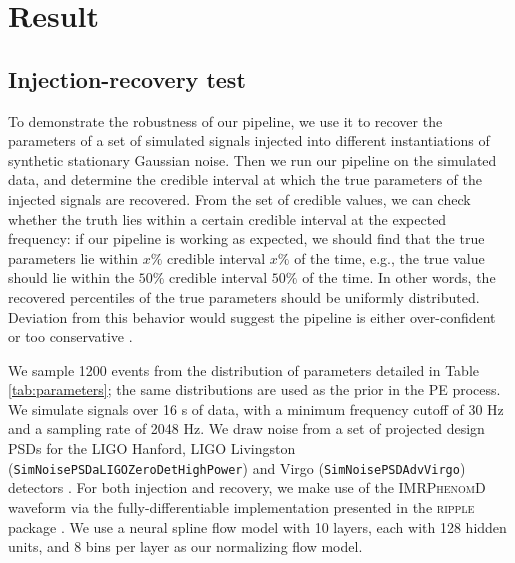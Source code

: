 \documentclass[twocolumn]{aastex631}
\begin{document}
\section{Result}
\label{sec: Result}
\subsection{Injection-recovery test}

To demonstrate the robustness of our pipeline, we use it to recover the
parameters of a set of simulated signals injected into different instantiations
of synthetic stationary Gaussian noise. Then we run our pipeline on the
simulated data, and determine the credible interval at which the true
parameters of the injected signals are recovered. From the set of credible
values, we can check whether the truth lies within a certain credible interval
at the expected frequency: if our pipeline is working as expected, we should
find that the true parameters lie within $x\%$ credible interval $x\%$ of the
time, e.g., the true value should lie within the $50\%$ credible interval
$50\%$ of the time. In other words, the recovered percentiles of the true
parameters should be uniformly distributed. Deviation from this behavior would
suggest the pipeline is either over-confident or too conservative
\citep{Cook2006,Talts2018}.

We sample 1200 events from the distribution of parameters detailed in Table
\ref{tab:parameters}; the same distributions are used as the prior in the PE
process.  We simulate signals over 16 s of data, with a minimum frequency
cutoff of 30 Hz and a sampling rate of 2048 Hz. We draw noise from a set of
projected design PSDs for the LIGO Hanford, LIGO Livingston
(\texttt{SimNoisePSDaLIGOZeroDetHighPower}) and Virgo
(\texttt{SimNoisePSDAdvVirgo}) detectors
\citep{lalsuite,Shoemaker:T0900288,2012arXiv1202.4031M}. For both injection and
recovery, we make use of the \textsc{IMRPhenomD} waveform \citep{Khan:2015jqa}
via the fully-differentiable implementation presented in the \textsc{ripple}
package \citep{ripplepaper}. We use a neural spline flow model \citep{2019arXiv190604032D}
with 10 layers, each with 128 hidden units, and 8 bins per layer as our
normalizing flow model.
\end{document}
